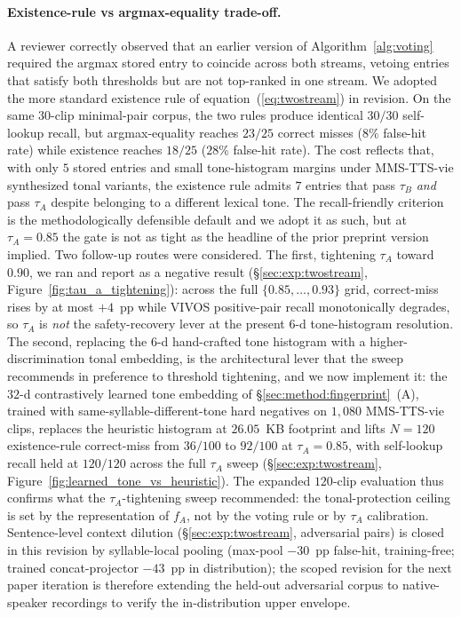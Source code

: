 \documentclass[a4paper,fleqn]{cas-dc}
\begin{document}
\paragraph{Existence-rule vs argmax-equality trade-off.} A reviewer correctly observed that an earlier version of Algorithm~\ref{alg:voting} required the argmax stored entry to coincide across both streams, vetoing entries that satisfy both thresholds but are not top-ranked in one stream. We adopted the more standard existence rule of equation~(\ref{eq:twostream}) in revision. On the same $30$-clip minimal-pair corpus, the two rules produce identical $30/30$ self-lookup recall, but argmax-equality reaches $23/25$ correct misses ($8\%$ false-hit rate) while existence reaches $18/25$ ($28\%$ false-hit rate). The cost reflects that, with only $5$ stored entries and small tone-histogram margins under MMS-TTS-vie synthesized tonal variants, the existence rule admits $7$ entries that pass $\tau_{B}$ \emph{and} pass $\tau_{A}$ despite belonging to a different lexical tone. The recall-friendly criterion is the methodologically defensible default and we adopt it as such, but at $\tau_{A}=0.85$ the gate is not as tight as the headline of the prior preprint version implied. Two follow-up routes were considered. The first, tightening $\tau_{A}$ toward $0.90$, we ran and report as a negative result (\S\ref{sec:exp:twostream}, Figure~\ref{fig:tau_a_tightening}): across the full $\{0.85, \ldots, 0.93\}$ grid, correct-miss rises by at most $+4$~pp while VIVOS positive-pair recall monotonically degrades, so $\tau_{A}$ is \emph{not} the safety-recovery lever at the present 6-d tone-histogram resolution. The second, replacing the 6-d hand-crafted tone histogram with a higher-discrimination tonal embedding, is the architectural lever that the sweep recommends in preference to threshold tightening, and we now implement it: the $32$-d contrastively learned tone embedding of \S\ref{sec:method:fingerprint}~(A), trained with same-syllable-different-tone hard negatives on $1{,}080$ MMS-TTS-vie clips, replaces the heuristic histogram at $26.05$~KB footprint and lifts $N=120$ existence-rule correct-miss from $36/100$ to $92/100$ at $\tau_A=0.85$, with self-lookup recall held at $120/120$ across the full $\tau_A$ sweep (\S\ref{sec:exp:twostream}, Figure~\ref{fig:learned_tone_vs_heuristic}). The expanded $120$-clip evaluation thus confirms what the $\tau_A$-tightening sweep recommended: the tonal-protection ceiling is set by the representation of $f_A$, not by the voting rule or by $\tau_A$ calibration. Sentence-level context dilution (\S\ref{sec:exp:twostream}, adversarial pairs) is closed in this revision by syllable-local pooling (max-pool $-30$~pp false-hit, training-free; trained concat-projector $-43$~pp in distribution); the scoped revision for the next paper iteration is therefore extending the held-out adversarial corpus to native-speaker recordings to verify the in-distribution upper envelope.
\end{document}

